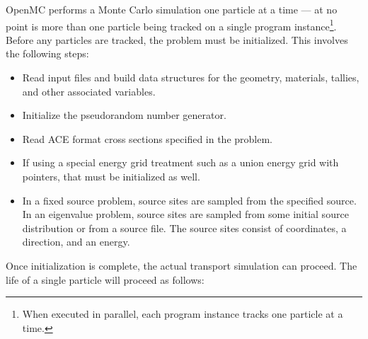 OpenMC performs a Monte Carlo simulation one particle at a time --- at no point
is more than one particle being tracked on a single program
instance\footnote{When executed in parallel, each program instance tracks one
  particle at a time.}. Before any particles are tracked, the problem must be
initialized. This involves the following steps:
\begin{itemize}
\item Read input files and build data structures for the geometry, materials,
  tallies, and other associated variables.
\item Initialize the pseudorandom number generator.
\item Read ACE format cross sections specified in the problem.
\item If using a special energy grid treatment such as a union energy grid with
  pointers, that must be initialized as well.
\item In a fixed source problem, source sites are sampled from the specified
  source. In an eigenvalue problem, source sites are sampled from some initial
  source distribution or from a source file. The source sites consist of
  coordinates, a direction, and an energy.
\end{itemize}
Once initialization is complete, the actual transport simulation can
proceed. The life of a single particle will proceed as follows:
